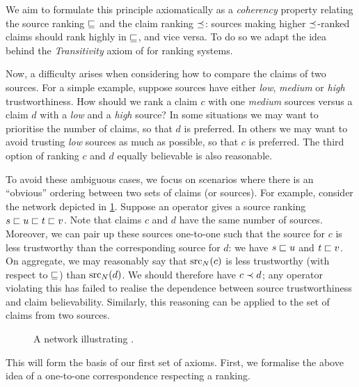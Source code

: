 We aim to formulate this principle axiomatically as a \emph{coherency} property
relating the source ranking $\sqsubseteq$ and the claim ranking $\preceq$: sources making
higher $\preceq$-ranked claims should rank highly in $\sqsubseteq$, and vice versa. To do
so we adapt the idea behind the \emph{Transitivity} axiom of
\textcite{altman2008} for ranking systems.

Now, a difficulty arises when considering how to compare the claims of two
sources. For a simple example, suppose sources have either \emph{low},
\emph{medium} or \emph{high} trustworthiness. How should we rank a claim $c$
with one \emph{medium} sources versus a claim $d$ with a \emph{low} and a
\emph{high} source? In some situations we may want to prioritise the number of
claims, so that $d$ is preferred. In others we may want to avoid trusting
\emph{low} sources as much as possible, so that $c$ is preferred. The third
option of ranking $c$ and $d$ equally believable is also reasonable.

To avoid these ambiguous cases, we focus on scenarios where there is an
``obvious'' ordering between two sets of claims (or sources). For example,
consider the network depicted in \cref{td_new_fig_coherence_intro}. Suppose an
operator gives a source ranking $s \sqsubset u \sqsubset t \sqsubset v$. Note that claims $c$
and $d$ have the same number of sources. Moreover, we can pair up these sources
one-to-one such that the source for $c$ is less trustworthy than the
corresponding source for $d$: we have $s \sqsubset u$ and $t \sqsubset v$. On aggregate,
we may reasonably say that $\operatorname{src}_N(c)$ is less trustworthy (with respect to
$\sqsubseteq$) than $\operatorname{src}_N(d)$. We should therefore have $c \prec d$; any operator
violating this has failed to realise the dependence between source
trustworthiness and claim believability. Similarly, this reasoning can be
applied to the set of claims from two sources.

\begin{figure}
    \centering

    \caption{
        A network illustrating \claimcoherence{}.
    }
    \label{td_new_fig_coherence_intro}
\end{figure}

This will form the basis of our first set of axioms. First, we formalise the
above idea of a one-to-one correspondence respecting a ranking.

